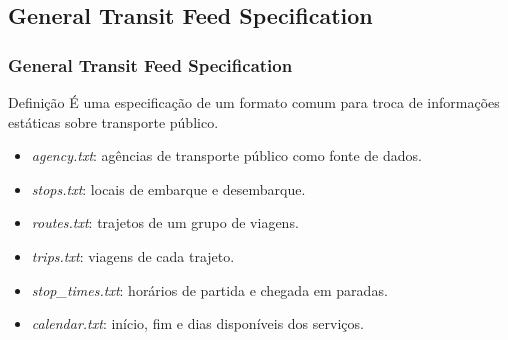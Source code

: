 \documentclass{beamer}
\begin{document}
\subsection{General Transit Feed Specification}
\begin{frame}
\frametitle{General Transit Feed Specification}
\begin{block}{Definição}
É uma especificação de um formato comum para troca de informações estáticas sobre transporte público.
\begin{itemize}
\item \textit{agency.txt}: agências de transporte público como fonte de dados.
\item \textit{stops.txt}: locais de embarque e desembarque.
\item \textit{routes.txt}: trajetos de um grupo de viagens.
\item \textit{trips.txt}: viagens de cada trajeto.
\item \textit{stop\_times.txt}: horários de partida e chegada em paradas.
\item \textit{calendar.txt}: início, fim e dias disponíveis dos serviços.
\end{itemize}
\end{block}
\end{frame}
\end{document}
